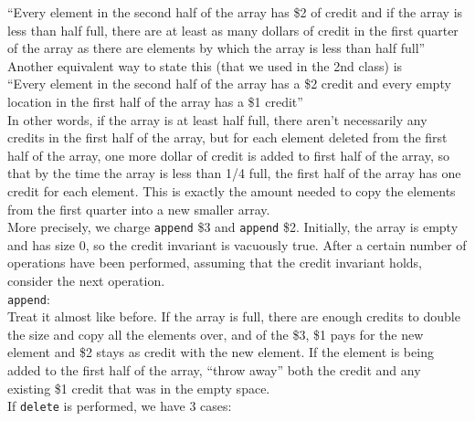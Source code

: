 \noindent ``Every element in the second half of the array has \$2 of credit and if the array is less than half full, there are at least as many dollars of credit in the first quarter of the array as there are elements by which the array is less than half full'' \\

\noindent Another equivalent way to state this (that we used in the 2nd class) is \\

\noindent ``Every element in the second half of the array has a \$2 credit and every empty location in the first half of the array has a \$1 credit'' \\

\noindent In other words, if the array is at least half full, there aren't necessarily any credits in the first half of the array, but for each element deleted from the first half of the array, one more dollar of credit is added to first half of the array, so that by the time the array is less than 1/4 full, the first half of the array has one credit for each element. This is exactly the amount needed to copy the elements from the first quarter into a new smaller array.\\

\noindent More precisely, we charge \texttt{append} \$3 and \texttt{append} \$2. Initially, the array is empty and has size 0, so the credit invariant is vacuously true. After a certain number of operations have been performed, assuming that the credit invariant holds, consider the next operation. \\

\noindent \texttt{append}: \\

\noindent Treat it almost like before. If the array is full, there are enough credits to double the size and copy all the elements over, and of the \$3, \$1 pays for the new element and \$2 stays as credit with the new element. If the element is being added to the first half of the array, ``throw away'' both the credit and any existing \$1 credit that was in the empty space. \\

\noindent If \texttt{delete} is performed, we have 3 cases:

